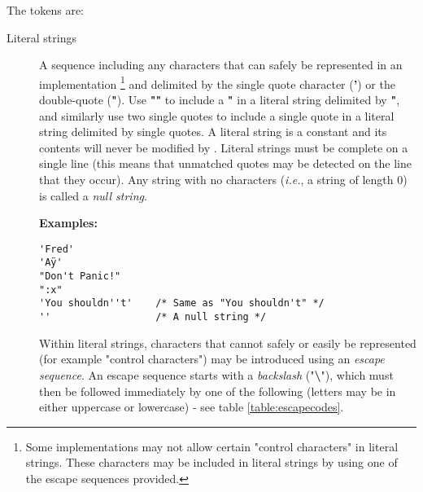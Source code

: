 The tokens are:
\begin{description}
\item[Literal strings]\label{refxstr}
\index{,}
\index{,}

A sequence including any characters that can safely be represented in
an implementation
\footnote{
Some implementations may not allow certain "control characters"
in literal strings.
These characters may be included in literal strings by using one of the
escape sequences provided.
}
and delimited by the single quote character (\textbf{'}) or the
double-quote (\textbf{"}).
Use \textbf{""} to include a \textbf{"} in a literal
string delimited by \textbf{"}, and similarly use two single
quotes to include a single quote in a literal string delimited by
single quotes.
A literal string is a constant and its contents will never be modified
by \nr{}.
Literal strings must be complete on a single line (this means that
unmatched quotes may be detected on the line that they occur).
 Any string with no characters (\emph{i.e.}, a string of length 0) is called
a \emph{null string}.
 
\textbf{Examples:}
\begin{lstlisting}
'Fred'
'Aÿ'
"Don't Panic!"
":x"
'You shouldn''t'    /* Same as "You shouldn't" */
''                  /* A null string */
\end{lstlisting}
 
Within literal strings, characters that cannot safely or easily be
represented (for example "control characters") may be introduced
using an \emph{escape sequence}.  An escape sequence starts with a
\emph{backslash} ("\textbf{\textbackslash }"), which must then be
followed immediately by one of the following (letters may be in either
uppercase or lowercase) - see table \ref{table:escapecodes}.


\end{description}
